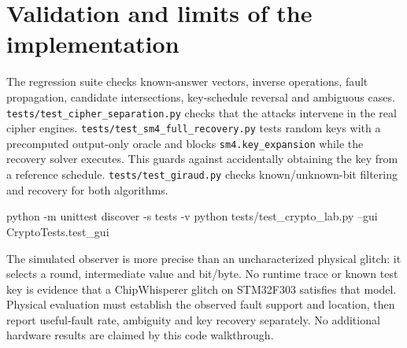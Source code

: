 \section{Validation and limits of the implementation}
The regression suite checks known-answer vectors, inverse operations, fault propagation, candidate intersections, key-schedule reversal and ambiguous cases. \texttt{tests/test\_\allowbreak{}cipher\_\allowbreak{}separation.py} checks that the attacks intervene in the real cipher engines. \texttt{tests/test\_\allowbreak{}sm4\_\allowbreak{}full\_\allowbreak{}recovery.py} tests random keys with a precomputed output-only oracle and blocks \texttt{sm4.key\_\allowbreak{}expansion} while the recovery solver executes. This guards against accidentally obtaining the key from a reference schedule. \texttt{tests/test\_\allowbreak{}giraud.py} checks known/unknown-bit filtering and recovery for both algorithms.
\begin{lightcode}
python -m unittest discover -s tests -v
python tests/test_crypto_lab.py --gui CryptoTests.test_gui
\end{lightcode}
The simulated observer is more precise than an uncharacterized physical glitch: it selects a round, intermediate value and bit/byte. No runtime trace or known test key is evidence that a ChipWhisperer glitch on STM32F303 satisfies that model. Physical evaluation must establish the observed fault support and location, then report useful-fault rate, ambiguity and key recovery separately. No additional hardware results are claimed by this code walkthrough.
